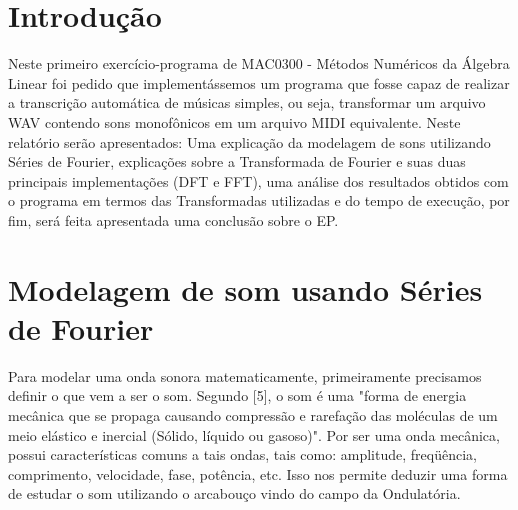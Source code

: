 \documentclass[brazil,times]{abnt}
\begin{document}





\data{\today}

\capa

\folhaderosto


\section*{Introdução\label{cap:introducao}}
	Neste primeiro exercício-programa de MAC0300 - Métodos Numéricos da Álgebra Linear foi pedido que implementássemos um programa que fosse capaz de realizar a transcrição automática de músicas simples, ou seja, transformar um arquivo WAV contendo sons monofônicos em um arquivo MIDI equivalente. Neste relatório serão apresentados: Uma explicação da modelagem de sons utilizando Séries de Fourier, explicações sobre a Transformada de Fourier e suas duas principais implementações (DFT e FFT), uma análise dos resultados obtidos com o programa em termos das Transformadas utilizadas e do tempo de execução, por fim, será feita apresentada uma conclusão sobre o EP.

\section*{Modelagem de som usando Séries de Fourier}
	Para modelar uma onda sonora matematicamente, primeiramente precisamos definir o que vem a ser o som. Segundo [5], o som é uma "forma de energia mecânica que se propaga causando compressão e rarefação das moléculas de um meio elástico e inercial (Sólido, líquido ou gasoso)". Por ser uma onda mecânica, possui características comuns a tais ondas, tais como: amplitude, freqüência, comprimento, velocidade, fase, potência, etc. Isso nos permite deduzir uma forma de estudar o som utilizando o arcabouço vindo do campo da Ondulatória.
	
\end{document}
